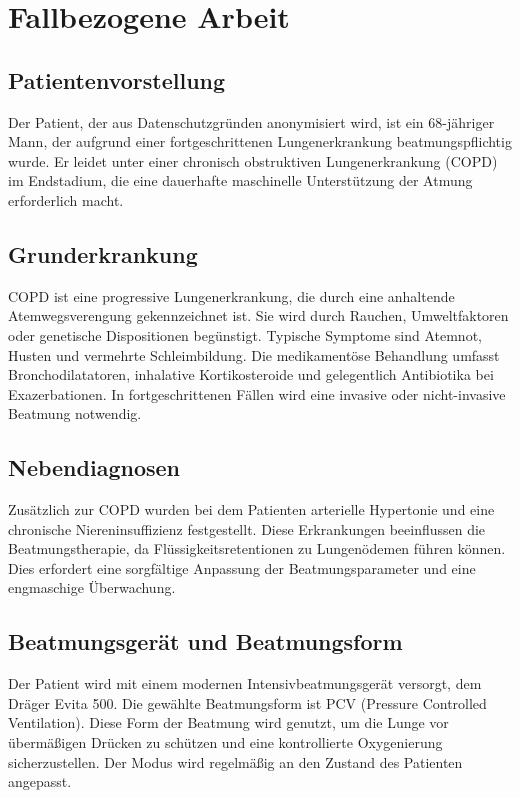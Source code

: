 \documentclass[a4paper,12pt]{article}
\begin{document}
\section{Fallbezogene Arbeit}

\subsection{Patientenvorstellung}
Der Patient, der aus Datenschutzgründen anonymisiert wird, ist ein 68-jähriger Mann,
der aufgrund einer fortgeschrittenen Lungenerkrankung beatmungspflichtig wurde.
Er leidet unter einer chronisch obstruktiven Lungenerkrankung (COPD) im Endstadium,
die eine dauerhafte maschinelle Unterstützung der Atmung erforderlich macht.

\subsection{Grunderkrankung}
COPD ist eine progressive Lungenerkrankung, die durch eine anhaltende Atemwegsverengung
gekennzeichnet ist. Sie wird durch Rauchen, Umweltfaktoren oder genetische
Dispositionen begünstigt. Typische Symptome sind Atemnot, Husten und vermehrte
Schleimbildung. Die medikamentöse Behandlung umfasst Bronchodilatatoren, inhalative
Kortikosteroide und gelegentlich Antibiotika bei Exazerbationen. In fortgeschrittenen
Fällen wird eine invasive oder nicht-invasive Beatmung notwendig.

\subsection{Nebendiagnosen}
Zusätzlich zur COPD wurden bei dem Patienten arterielle Hypertonie und eine chronische
Niereninsuffizienz festgestellt. Diese Erkrankungen beeinflussen die Beatmungstherapie,
da Flüssigkeitsretentionen zu Lungenödemen führen können. Dies erfordert eine
sorgfältige Anpassung der Beatmungsparameter und eine engmaschige Überwachung.

\subsection{Beatmungsgerät und Beatmungsform}
Der Patient wird mit einem modernen Intensivbeatmungsgerät versorgt, dem Dräger Evita
500. Die gewählte Beatmungsform ist PCV (Pressure Controlled Ventilation). Diese Form
der Beatmung wird genutzt, um die Lunge vor übermäßigen Drücken zu schützen und eine
kontrollierte Oxygenierung sicherzustellen. Der Modus wird regelmäßig an den Zustand
des Patienten angepasst.
\end{document}
